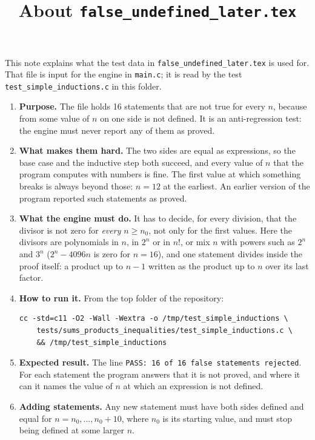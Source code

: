 \documentclass[11pt,a4paper]{article}
\title{About \texttt{false\_undefined\_later.tex}}
\author{}
\date{}
\begin{document}
\maketitle
This note explains what the test data in \texttt{false\_undefined\_later.tex} is used for. That file is input for the engine in \texttt{main.c}; it is read by the test \texttt{test\_simple\_inductions.c} in this folder.

\begin{enumerate}
\item \textbf{Purpose.} The file holds 16 statements that are not true for every $n$, because from some value of $n$ on one side is not defined. It is an anti-regression test: the engine must never report any of them as proved.

\item \textbf{What makes them hard.} The two sides are equal as expressions, so the base case and the inductive step both succeed, and every value of $n$ that the program computes with numbers is fine. The first value at which something breaks is always beyond those: $n = 12$ at the earliest. An earlier version of the program reported such statements as proved.

\item \textbf{What the engine must do.} It has to decide, for every division, that the divisor is not zero for \emph{every} $n \ge n_0$, not only for the first values. Here the divisors are polynomials in $n$, in $2^n$ or in $n!$, or mix $n$ with powers such as $2^n$ and $3^n$ ($2^n - 4096 n$ is zero for $n = 16$), and one statement divides inside the proof itself: a product up to $n - 1$ written as the product up to $n$ over its last factor.

\item \textbf{How to run it.} From the top folder of the repository:
\begin{verbatim}
cc -std=c11 -O2 -Wall -Wextra -o /tmp/test_simple_inductions \
    tests/sums_products_inequalities/test_simple_inductions.c \
    && /tmp/test_simple_inductions
\end{verbatim}

\item \textbf{Expected result.} The line \texttt{PASS: 16 of 16 false statements rejected}. For each statement the program answers that it is not proved, and where it can it names the value of $n$ at which an expression is not defined.

\item \textbf{Adding statements.} Any new statement must have both sides defined and equal for $n = n_0, \ldots, n_0 + 10$, where $n_0$ is its starting value, and must stop being defined at some larger $n$.
\end{enumerate}
\end{document}
